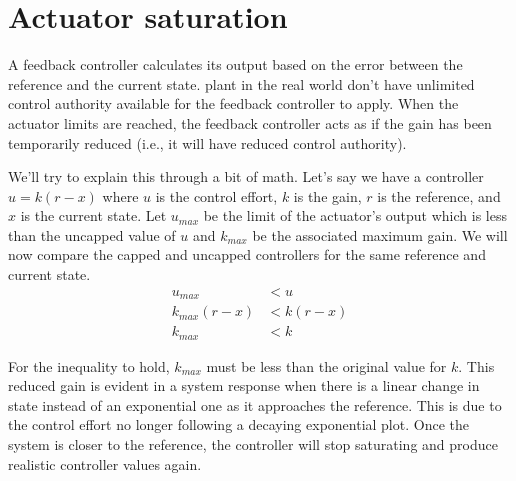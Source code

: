 \section{Actuator saturation}

A feedback controller calculates its output based on the error between the
\gls{reference} and the current \gls{state}. \Gls{plant} in the real world don't
have unlimited control authority available for the feedback controller to apply.
When the actuator limits are reached, the feedback controller acts as if the
gain has been temporarily reduced (i.e., it will have reduced control
authority).

We'll try to explain this through a bit of math. Let's say we have a controller
$u = k(r - x)$ where $u$ is the \gls{control effort}, $k$ is the gain, $r$ is
the \gls{reference}, and $x$ is the current \gls{state}. Let $u_{max}$ be the
limit of the actuator's output which is less than the uncapped value of $u$ and
$k_{max}$ be the associated maximum gain. We will now compare the capped and
uncapped controllers for the same \gls{reference} and current \gls{state}.
\begin{align*}
  u_{max} &< u \\
  k_{max}(r - x) &< k(r - x) \\
  k_{max} &< k
\end{align*}

For the inequality to hold, $k_{max}$ must be less than the original value for
$k$. This reduced gain is evident in a \gls{system response} when there is a
linear change in state instead of an exponential one as it approaches the
\gls{reference}. This is due to the \gls{control effort} no longer following a
decaying exponential plot. Once the \gls{system} is closer to the
\gls{reference}, the controller will stop saturating and produce realistic
controller values again.
